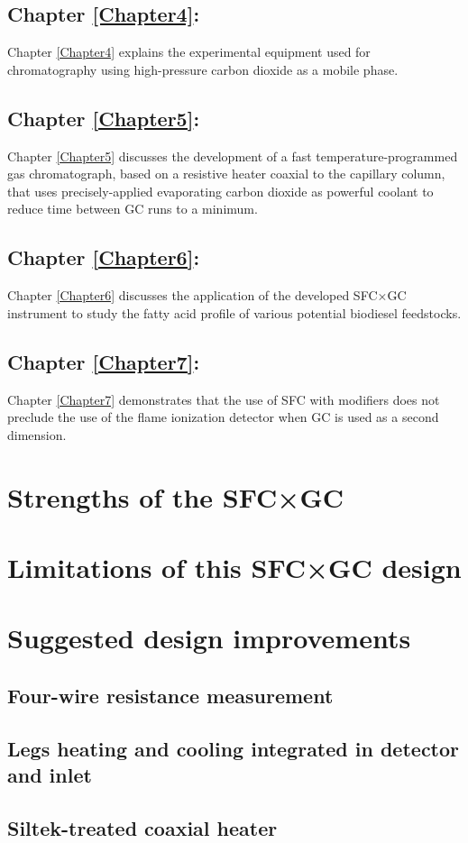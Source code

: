 \subsection{Chapter \ref{Chapter4}:  }

Chapter \ref{Chapter4} explains the experimental equipment used for
chromatography using high-pressure carbon dioxide as a mobile phase.

\subsection{Chapter \ref{Chapter5}:  }

Chapter \ref{Chapter5} discusses the development of a fast
temperature-programmed gas chromatograph, based on a resistive heater coaxial to
the capillary column, that uses precisely-applied evaporating carbon dioxide as
powerful coolant to reduce time between GC runs to a minimum.

\subsection{Chapter \ref{Chapter6}:  }

Chapter \ref{Chapter6} discusses the application of the developed SFC×GC
instrument to study the fatty acid profile of various potential biodiesel
feedstocks.

\subsection{Chapter \ref{Chapter7}:  }

Chapter \ref{Chapter7} demonstrates that the use of SFC with modifiers does not
preclude the use of the flame ionization detector when GC is used as a second
dimension.

\section{Strengths of the SFC×GC}

\section{Limitations of this SFC×GC design}

\subsection{}

\section{Suggested design improvements}



\subsection{Four-wire resistance measurement}
\subsection{Legs heating and cooling integrated in detector and inlet}
\subsection{Siltek-treated coaxial heater}

